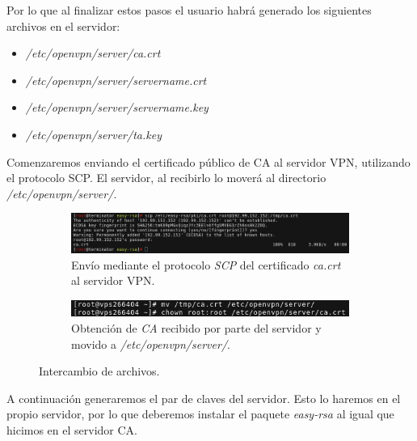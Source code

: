 \documentclass[a4paper, 11pt, titlepage]{article}
\begin{document}
            Por lo que al finalizar estos pasos el usuario habrá generado los siguientes archivos en el 
            servidor:
        
            \begin{itemize}
                \item \textit{/etc/openvpn/server/ca.crt}
                \item \textit{/etc/openvpn/server/servername.crt}
                \item \textit{/etc/openvpn/server/servername.key}
                \item \textit{/etc/openvpn/server/ta.key}
            \end{itemize}
        
            Comenzaremos enviando el certificado público de CA al servidor VPN, utilizando el protocolo SCP. 
            El servidor, al recibirlo lo moverá al directorio \textit{/etc/openvpn/server/}.
        
            \begin{figure}[htp]
            \centering
                \begin{subfigure}[b]{1\linewidth}
                \includegraphics[width=1\textwidth]{resources/ca06.png}
                \caption{Envío mediante el protocolo \textit{SCP} del certificado \textit{ca.crt} al servidor VPN.}
                \end{subfigure}
            
                \begin{subfigure}[b]{0.7\linewidth}
                \includegraphics[width=1\textwidth]{resources/ca07.png}
                \caption{Obtención de \textit{CA} recibido por parte del servidor y movido a \textit{/etc/openvpn/server/}.}
                \end{subfigure}
            \caption{Intercambio de archivos.}
            \label{fig:ca0607}
            \end{figure}
        
            A continuación generaremos el par de claves del servidor. Esto lo haremos en el propio servidor,
            por lo que deberemos instalar el paquete \textit{easy-rsa} al igual que hicimos en el servidor CA.
        
\end{document}
